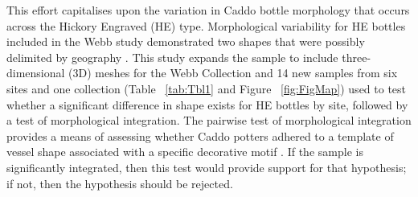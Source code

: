 \documentclass[review]{elsarticle}
\begin{document}
This effort capitalises upon the variation in Caddo bottle morphology that occurs across the Hickory Engraved (HE) type. Morphological variability for HE bottles included in the Webb study demonstrated two shapes that were possibly delimited by geography \citep{RN11716}. This study expands the sample to include three-dimensional (3D) meshes for the Webb Collection and 14 new samples from six sites and one collection (Table ~\ref{tab:Tbl1} and Figure ~\ref{fig:FigMap}) used to test whether a significant difference in shape exists for HE bottles by site, followed by a test of morphological integration. The pairwise test of morphological integration provides a means of assessing whether Caddo potters adhered to a template of vessel shape associated with a specific decorative motif \citep{RN1660}. If the sample is significantly integrated, then this test would provide support for that hypothesis; if not, then the hypothesis should be rejected.
\end{document}
